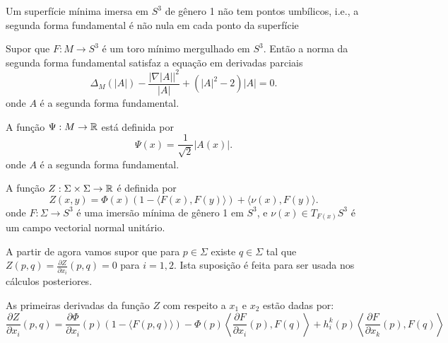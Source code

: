 \cite{Brendle2013}
\cite{Brendle2013a}

\begin{proposicao}
	Um superfície mínima imersa em $S^3$ de gênero 1 não tem pontos umbílicos, i.e., a segunda forma fundamental é não nula em cada ponto da superfície
\end{proposicao}

\begin{proposicao}
	Supor que $F: M \rightarrow S^3$ é um toro mínimo mergulhado em $S^3$. Então a norma da segunda forma fundamental satisfaz a equação em derivadas parciais
	\begin{equation*}
		\Delta_M (|A|) - \frac{| \nabla |A| |^2}{|A|} + (|A|^2 - 2) |A| = 0.
	\end{equation*}
	onde $A$ é a segunda forma fundamental.
\end{proposicao}

\begin{definicao}
	A função $\Psi: M \rightarrow \mathbb{R}$ está definida por
	\begin{equation*}
		\Psi(x) = \frac{1}{\sqrt{2}} |A(x)|.
	\end{equation*}
	onde $A$ é a segunda forma fundamental.
\end{definicao}

\begin{definicao}
	A função $Z: \Sigma \times \Sigma \rightarrow \mathbb{R}$ é definida por
	\begin{equation*}
		Z(x,y) =  \Phi(x) (1 - \langle F(x), F(y) \rangle) + \langle \nu(x), F(y) \rangle.
	\end{equation*}
	onde $F: \Sigma \rightarrow S^3$ é uma imersão mínima de gênero 1 em $S^3$, e $\nu(x) \in T_{F(x)} S^3$ é um campo vectorial normal unitário.
\end{definicao}

\begin{observacao}
	 A partir de agora vamos supor que para $p \in \Sigma$ existe $q \in \Sigma$ tal que $Z(p,q) = \frac{\partial Z}{\partial x_i}(p,q) = 0$ para $i = 1,2$. Ista suposição é feita para ser usada nos cálculos posteriores.
\end{observacao}

\begin{proposicao}\label{primeira_derivada_x_Z}
	As primeiras derivadas da função $Z$ com respeito a $x_1$ e $x_2$ estão dadas por:
	\begin{equation}\label{diff_Z_x}
	\frac{\partial Z}{\partial x_i} (p, q) =  \frac{\partial \Phi}{\partial x_i}(p) (1 - \langle F(p, q) \rangle) -  \Phi(p) \left\langle \frac{\partial F}{\partial x_i}(p), F(q) \right\rangle + h_i^k(p) \left\langle \frac{\partial F}{\partial x_k}(p), F(q) \right\rangle
	\end{equation}
\end{proposicao}


